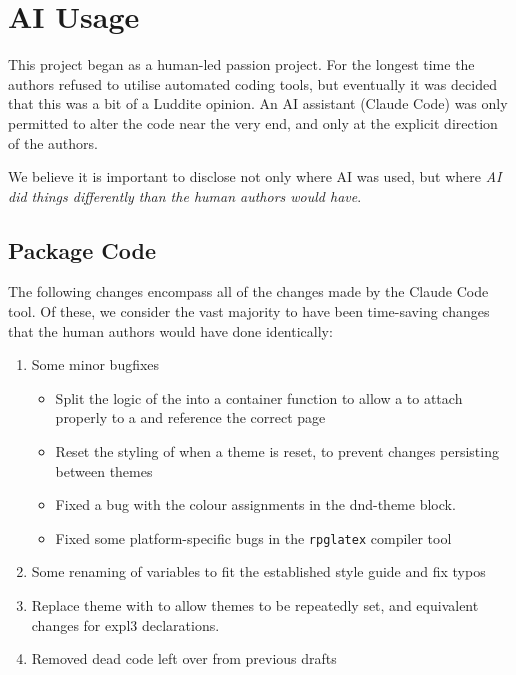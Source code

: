 \chapter{AI Usage} \label{A:AI}

	This project began as a human-led passion project. For the longest time the authors refused to utilise automated coding tools, but eventually it was decided that this was a bit of a Luddite opinion. An AI assistant (Claude Code) was only permitted to alter the code near the very end, and only at the explicit direction of the authors.

	We believe it is important to disclose not only where AI was used, but where \textit{AI did things differently than the human authors would have}.
	\section*{Package Code}

		The following changes encompass all of the changes made by the Claude Code tool. Of these, we consider the vast majority to have been time-saving changes that the human authors would have done identically:

		\begin{enumerate}
			\item Some minor bugfixes
			      \begin{itemize}
				      \item Split the logic of the  into a container function to allow a  to attach properly to a  and reference the correct page
				      \item Reset the styling of  when a theme is reset, to prevent changes persisting between themes
				      \item Fixed a bug with the colour assignments in the dnd-theme  block.
				      \item Fixed some platform-specific bugs in the \texttt{rpglatex} compiler tool
			      \end{itemize}
			\item Some renaming of variables to fit the established style guide and fix typos
			\item Replace theme  with  to allow themes to be repeatedly set, and equivalent changes for expl3 declarations.
			\item Removed dead code left over from previous drafts
		\end{enumerate}


